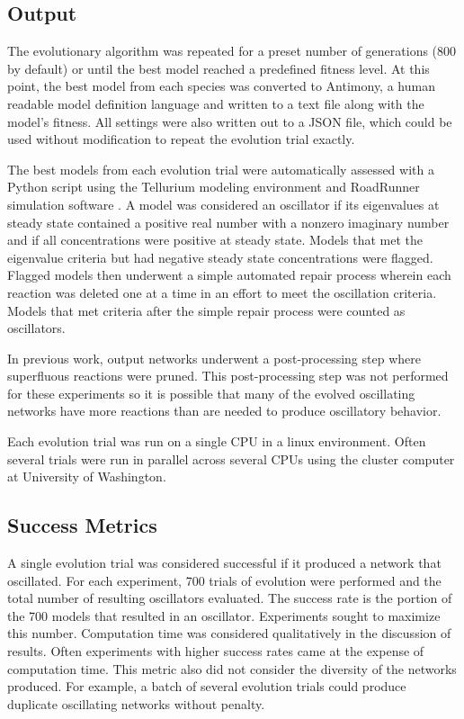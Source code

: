 \documentclass[12pt]{report}
\begin{document}
\subsection{Output}
The evolutionary algorithm was repeated for a preset number of generations (800 by default) or until the best model reached a predefined fitness level. At this point, the best model from each species was converted to Antimony, a human readable model definition language \cite{Smith2009} and written to a text file along with the model's fitness. All settings were also written out to a JSON file, which could be used without modification to repeat the evolution trial exactly.

The best models from each evolution trial were automatically assessed with a Python script using the Tellurium modeling environment \cite{Choi2018} and RoadRunner simulation software \cite{andy2020}. A model was considered an oscillator if its eigenvalues at steady state contained a positive real number with a nonzero imaginary number and if all concentrations were positive at steady state. Models that met the eigenvalue criteria but had negative steady state concentrations were flagged. Flagged models then underwent a simple automated repair process wherein each reaction was deleted one at a time in an effort to meet the oscillation criteria. Models that met criteria after the simple repair process were counted as oscillators.

In previous work, output networks underwent a post-processing step where superfluous reactions were pruned. This post-processing step was not performed for these experiments so it is possible that many of the evolved oscillating networks have more reactions than are needed to produce oscillatory behavior.

Each evolution trial was run on a single CPU in a linux environment. Often several trials were run in parallel across several CPUs using the cluster computer at University of Washington.

\subsection{Success Metrics}
A single evolution trial was considered successful if it produced a network that oscillated. For each experiment, 700 trials of evolution were performed and the total number of resulting oscillators evaluated. The success rate is the portion of the 700 models that resulted in an oscillator. Experiments sought to maximize this number. Computation time was considered qualitatively in the discussion of results. Often experiments with higher success rates came at the expense of computation time. This metric also did not consider the diversity of the networks produced. For example, a batch of several evolution trials could produce duplicate oscillating networks without penalty. 
\end{document}
